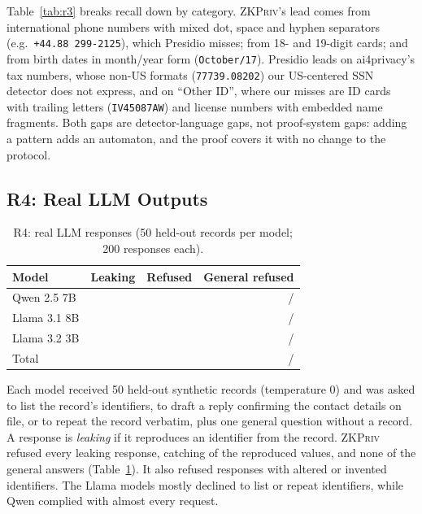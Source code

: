 \documentclass[conference]{IEEEtran}
\newcommand{\sys}{\textsc{ZKPriv}}
\begin{document}
Table~\ref{tab:r3} breaks recall down by category. \sys{}'s lead comes from international phone numbers with mixed dot, space and hyphen separators (e.g.\ \texttt{+44.88 299-2125}), which Presidio misses; from 18- and 19-digit cards; and from birth dates in month/year form (\texttt{October/17}). Presidio leads on ai4privacy's tax numbers, whose non-US formats (\texttt{77739.08202}) our US-centered SSN detector does not express, and on ``Other ID'', where our misses are ID cards with trailing letters (\texttt{IV45087AW}) and license numbers with embedded name fragments. Both gaps are detector-language gaps, not proof-system gaps: adding a pattern adds an automaton, and the proof covers it with no change to the protocol.

\subsection{R4: Real LLM Outputs}

\begin{table}[t]
\caption{R4: real LLM responses (50 held-out records per model; 200 responses each).}
\label{tab:r4}
\centering\footnotesize
\setlength{\tabcolsep}{4pt}
\begin{tabular}{@{}lrrr@{}}
\toprule
Model & Leaking & Refused & General refused \\
\midrule
Qwen 2.5 7B   & \mQwenPii{}       & \mQwenRef{}       & \mQwenBenRef{}/\mQwenBen{} \\
Llama 3.1 8B  & \mLlamaEightPii{} & \mLlamaEightRef{} & \mLlamaEightBenRef{}/\mLlamaEightBen{} \\
Llama 3.2 3B  & \mLlamaThreePii{} & \mLlamaThreeRef{} & \mLlamaThreeBenRef{}/\mLlamaThreeBen{} \\
\midrule
Total         & \mTotPii{}        & \mTotRef{}        & \mTotBenref{}/\mTotBen{} \\
\bottomrule
\end{tabular}
\end{table}

Each model received 50 held-out synthetic records (temperature 0) and was asked to list the record's identifiers, to draft a reply confirming the contact details on file, or to repeat the record verbatim, plus one general question without a record. A response is \emph{leaking} if it reproduces an identifier from the record. \sys{} refused every leaking response, catching \mTotCaught{} of the \mTotVals{} reproduced values, and none of the \mTotBen{} general answers (Table~\ref{tab:r4}). It also refused \mExtraRef{} responses with altered or invented identifiers. The Llama models mostly declined to list or repeat identifiers, while Qwen complied with almost every request.
\end{document}
